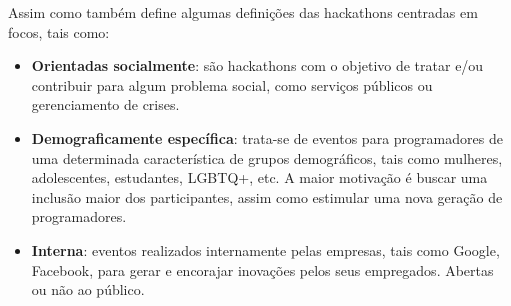 Assim como \citet{briscoe2014digital} também define algumas definições das hackathons centradas em focos, tais como:
\begin{itemize}
  \item \textbf{Orientadas socialmente}: são hackathons com o objetivo de tratar e/ou contribuir para algum problema social, como serviços públicos ou gerenciamento de crises.
  \item \textbf{Demograficamente específica}: trata-se de eventos para programadores de uma determinada característica de grupos demográficos, tais como mulheres, adolescentes, estudantes, LGBTQ+, etc. A maior motivação é buscar uma inclusão maior dos participantes, assim como estimular uma nova geração de programadores.
  \item \textbf{Interna}: eventos realizados internamente pelas empresas, tais como Google, Facebook, para gerar e encorajar inovações pelos seus empregados. Abertas ou não ao público.
\end{itemize}

